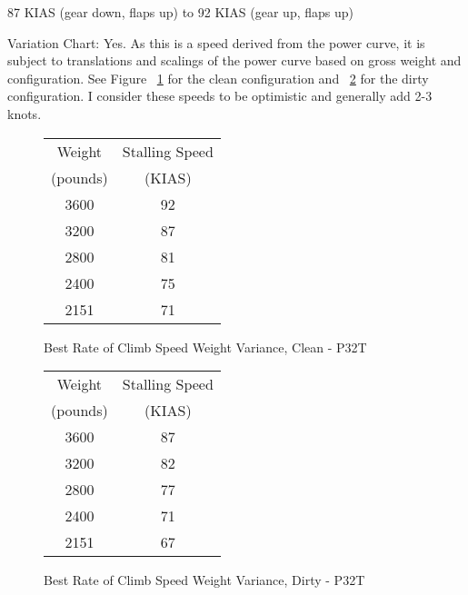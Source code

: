 87 KIAS (gear down, flaps up) to 92 KIAS (gear up, flaps up)

Variation Chart: Yes. As this is a speed derived from the power curve, it is subject to translations and scalings of the power curve based on gross weight and configuration. See Figure ~\ref{fig:VYCleanP32T} for the clean configuration and ~\ref{fig:VYDirtyP32T} for the dirty configuration. I consider these speeds to be optimistic and generally add 2-3 knots.

\begin{figure}
\begin{center}
\begin{tabular}{ |c|c| }
    \hline
    Weight & Stalling Speed \\
    (pounds) & (KIAS) \\
    \hline
     3600 &  92 \\
     3200 &  87 \\
    \hline
     2800 &  81 \\
     2400 &  75 \\
    \hline
     2151 &  71 \\
    \hline
\end{tabular}
\end{center}
\caption{Best Rate of Climb Speed Weight Variance, Clean - P32T}
\label{fig:VYCleanP32T}
\end{figure}

\begin{figure}
\begin{center}
\begin{tabular}{ |c|c| }
    \hline
    Weight & Stalling Speed \\
    (pounds) & (KIAS) \\
    \hline
     3600 &  87 \\
     3200 &  82 \\
    \hline
     2800 &  77 \\
     2400 &  71 \\
    \hline
     2151 &  67 \\
    \hline
\end{tabular}
\end{center}
\caption{Best Rate of Climb Speed Weight Variance, Dirty - P32T}
\label{fig:VYDirtyP32T}
\end{figure}

